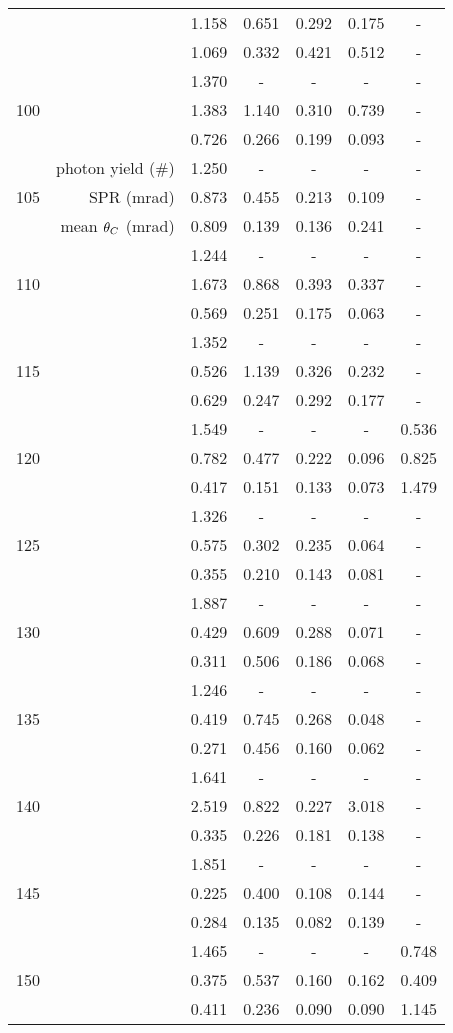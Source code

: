 \begin{longtable}{|crccccc|}
	 &  & 1.158 & 0.651 & 0.292 & 0.175 & - \\* 
	 &  & 1.069 & 0.332 & 0.421 & 0.512 & - \\ \hline 
\multirow{3}{*}{100} &  & 1.370 & - & - & - & - \\* 
	 &  & 1.383 & 1.140 & 0.310 & 0.739 & - \\* 
	 &  & 0.726 & 0.266 & 0.199 & 0.093 & - \\ \hline 
\multirow{3}{*}{105} & photon yield (\#) & 1.250 & - & - & - & - \\* 
	 & SPR (mrad) & 0.873 & 0.455 & 0.213 & 0.109 & - \\* 
	 & mean $\theta_{C}$ (mrad) & 0.809 & 0.139 & 0.136 & 0.241 & - \\ \hline 
\multirow{3}{*}{110} &  & 1.244 & - & - & - & - \\* 
	 &  & 1.673 & 0.868 & 0.393 & 0.337 & - \\* 
	 &  & 0.569 & 0.251 & 0.175 & 0.063 & - \\ \hline 
\multirow{3}{*}{115} &  & 1.352 & - & - & - & - \\* 
	 &  & 0.526 & 1.139 & 0.326 & 0.232 & - \\* 
	 &  & 0.629 & 0.247 & 0.292 & 0.177 & - \\ \hline 
\multirow{3}{*}{120} &  & 1.549 & - & - & - & 0.536 \\* 
	 &  & 0.782 & 0.477 & 0.222 & 0.096 & 0.825 \\* 
	 &  & 0.417 & 0.151 & 0.133 & 0.073 & 1.479 \\ \hline 
\multirow{3}{*}{125} &  & 1.326 & - & - & - & - \\* 
	 &  & 0.575 & 0.302 & 0.235 & 0.064 & - \\* 
	 &  & 0.355 & 0.210 & 0.143 & 0.081 & - \\ \hline 
\multirow{3}{*}{130} &  & 1.887 & - & - & - & - \\* 
	 &  & 0.429 & 0.609 & 0.288 & 0.071 & - \\* 
	 &  & 0.311 & 0.506 & 0.186 & 0.068 & - \\ \hline 
\multirow{3}{*}{135} &  & 1.246 & - & - & - & - \\* 
	 &  & 0.419 & 0.745 & 0.268 & 0.048 & - \\* 
	 &  & 0.271 & 0.456 & 0.160 & 0.062 & - \\ \hline 
\multirow{3}{*}{140} &  & 1.641 & - & - & - & - \\* 
	 &  & 2.519 & 0.822 & 0.227 & 3.018 & - \\* 
	 &  & 0.335 & 0.226 & 0.181 & 0.138 & - \\ \hline 
\multirow{3}{*}{145} &  & 1.851 & - & - & - & - \\* 
	 &  & 0.225 & 0.400 & 0.108 & 0.144 & - \\* 
	 &  & 0.284 & 0.135 & 0.082 & 0.139 & - \\ \hline 
\multirow{3}{*}{150} &  & 1.465 & - & - & - & 0.748 \\* 
	 &  & 0.375 & 0.537 & 0.160 & 0.162 & 0.409 \\* 
	 &  & 0.411 & 0.236 & 0.090 & 0.090 & 1.145 \\ \hline 

\end{longtable}
